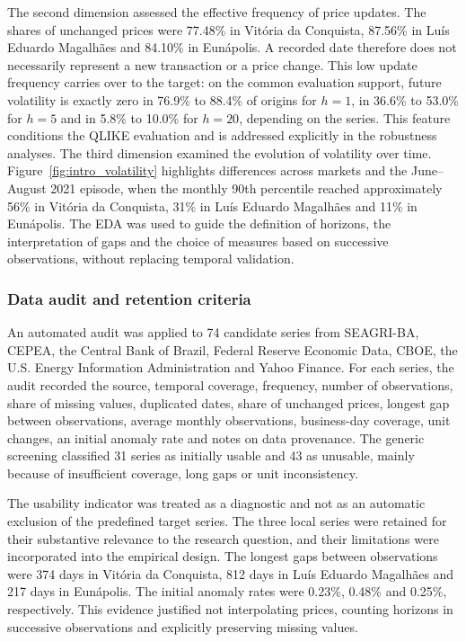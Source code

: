 \documentclass[a4paper,fleqn]{cas-sc}
\begin{document}
The second dimension assessed the effective frequency of price updates. The shares of unchanged prices were 77.48\% in Vitória da Conquista, 87.56\% in Luís Eduardo Magalhães and 84.10\% in Eunápolis. A recorded date therefore does not necessarily represent a new transaction or a price change. This low update frequency carries over to the target: on the common evaluation support, future volatility is exactly zero in 76.9\% to 88.4\% of origins for \(h=1\), in 36.6\% to 53.0\% for \(h=5\) and in 5.8\% to 10.0\% for \(h=20\), depending on the series. This feature conditions the QLIKE evaluation and is addressed explicitly in the robustness analyses. The third dimension examined the evolution of volatility over time. Figure~\ref{fig:intro_volatility} highlights differences across markets and the June--August 2021 episode, when the monthly 90th percentile reached approximately 56\% in Vitória da Conquista, 31\% in Luís Eduardo Magalhães and 11\% in Eunápolis. The EDA was used to guide the definition of horizons, the interpretation of gaps and the choice of measures based on successive observations, without replacing temporal validation.

\subsubsection{Data audit and retention criteria}
\label{subsec:data_audit}

An automated audit was applied to 74 candidate series from SEAGRI-BA, CEPEA, the Central Bank of Brazil, Federal Reserve Economic Data, CBOE, the U.S. Energy Information Administration and Yahoo Finance. For each series, the audit recorded the source, temporal coverage, frequency, number of observations, share of missing values, duplicated dates, share of unchanged prices, longest gap between observations, average monthly observations, business-day coverage, unit changes, an initial anomaly rate and notes on data provenance. The generic screening classified 31 series as initially usable and 43 as unusable, mainly because of insufficient coverage, long gaps or unit inconsistency.

The usability indicator was treated as a diagnostic and not as an automatic exclusion of the predefined target series. The three local series were retained for their substantive relevance to the research question, and their limitations were incorporated into the empirical design. The longest gaps between observations were 374 days in Vitória da Conquista, 812 days in Luís Eduardo Magalhães and 217 days in Eunápolis. The initial anomaly rates were 0.23\%, 0.48\% and 0.25\%, respectively. This evidence justified not interpolating prices, counting horizons in successive observations and explicitly preserving missing values.
\end{document}
